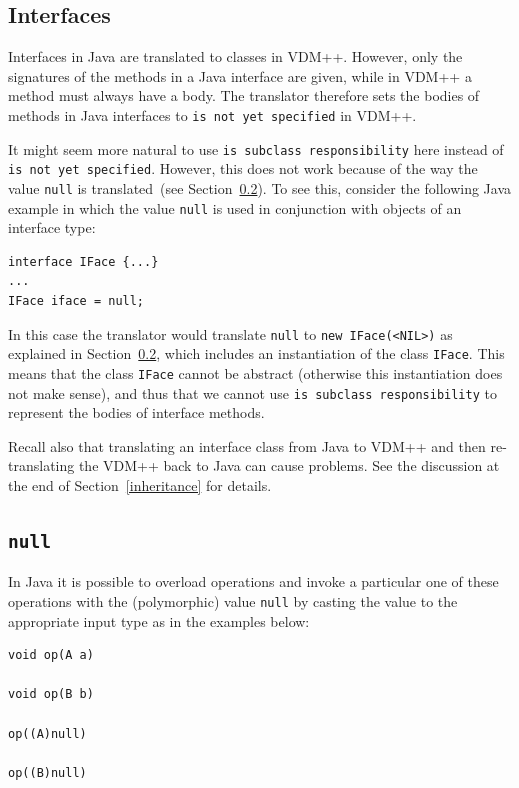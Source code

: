 \documentclass[\pformat,12pt]{article}
\begin{document}
\subsection{Interfaces}\label{interface}

Interfaces in Java are translated to classes in VDM++. However, only
the signatures of the methods in a Java interface are given, while in
VDM++ a method must always have a body. The translator therefore sets
the bodies of methods in Java interfaces to \texttt{is not yet
  specified} in VDM++. 

It might seem more natural to use \texttt{is subclass responsibility}
  here instead of \texttt{is not yet specified}. However, this does
  not work because of the way the value \texttt{null} is
  translated~(see Section~\ref{null}). To see this, consider the
  following Java example in which the value \texttt{null} is used in
  conjunction with objects of an interface type:

\begin{small}
\begin{verbatim}
interface IFace {...}
...
IFace iface = null;
\end{verbatim}
\end{small}

In this case the translator would translate \texttt{null} to
\texttt{new IFace(<NIL>)} as explained in 
Section~\ref{null}, which includes an instantiation of the class
\texttt{IFace}. This means that the class \texttt{IFace} cannot be
abstract (otherwise this instantiation does not make sense), and thus
that we cannot use \texttt{is subclass responsibility} to represent
the bodies of interface methods.

Recall also that translating an interface class from Java to VDM++ and
then re-translating the VDM++ back to Java can cause problems. See the
discussion at the end of Section~\ref{inheritance} for details.


\subsection{\texttt{null}}\label{null}

In Java it is possible to overload operations and invoke a particular
one of these operations with the (polymorphic) value \texttt{null} by
casting the value to the appropriate input type as in the examples
below: 

\begin{small}
\begin{verbatim}
void op(A a)  
 
void op(B b)   

op((A)null)

op((B)null)
\end{verbatim}
\end{small}
\end{document}
